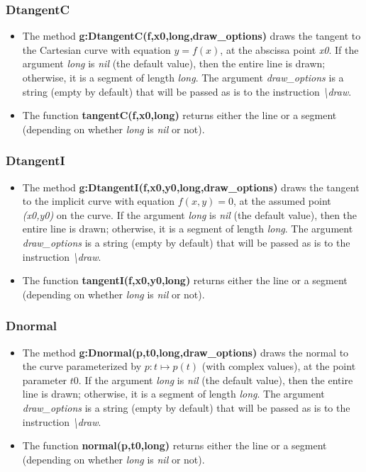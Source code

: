 \subsubsection{ DtangentC}
\begin{itemize}
    \item The method \textbf{g:DtangentC(f,x0,long,draw\_options)} draws the tangent to the Cartesian curve with equation \(y=f(x)\), at the abscissa point \emph{x0}. If the argument \emph{long} is \emph{nil} (the default value), then the entire line is drawn; otherwise, it is a segment of length \emph{long}. The argument \emph{draw\_options} is a string (empty by default) that will be passed as is to the instruction \emph{\textbackslash draw}.
    \item The function \textbf{tangentC(f,x0,long)} returns either the line or a segment (depending on whether \emph{long} is \emph{nil} or not).
\end{itemize}

\subsubsection{ DtangentI}
\begin{itemize}
    \item The method \textbf{g:DtangentI(f,x0,y0,long,draw\_options)} draws the tangent to the implicit curve with equation \(f(x,y)=0\), at the assumed point \emph{(x0,y0)} on the curve. If the argument \emph{long} is \emph{nil} (the default value), then the entire line is drawn; otherwise, it is a segment of length \emph{long}. The argument \emph{draw\_options} is a string (empty by default) that will be passed as is to the instruction \emph{\textbackslash draw}.
    \item The function \textbf{tangentI(f,x0,y0,long)} returns either the line or a segment (depending on whether \emph{long} is \emph{nil} or not).
\end{itemize}

\subsubsection{Dnormal}
\begin{itemize}
    \item The method \textbf{g:Dnormal(p,t0,long,draw\_options)} draws the normal to the curve parameterized by \(p: t \mapsto p(t)\) (with complex values), at the point parameter \(t0\). If the argument \emph{long} is \emph{nil} (the default value), then the entire line is drawn; otherwise, it is a segment of length \emph{long}. The argument \emph{draw\_options} is a string (empty by default) that will be passed as is to the instruction \emph{\textbackslash draw}.
    \item The function \textbf{normal(p,t0,long)} returns either the line or a segment (depending on whether \emph{long} is \emph{nil} or not).
\end{itemize}

